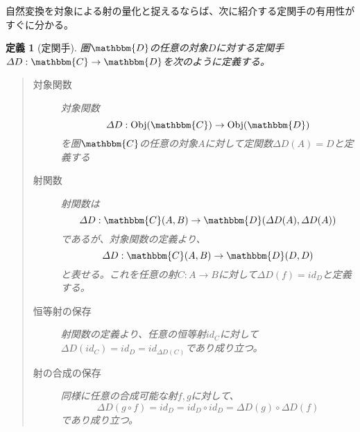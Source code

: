 \documentclass[uplatex,dvipdfmx]{jsarticle}
\newcommand{\cat}[1]{\mathbbm{#1}}
\newcommand{\arrow}{\rightarrow}
\newcommand{\functor}[3]{#1:\cat{#2}\arrow \cat{#3}}
\newcommand{\obj}[1]{\mathrm{Obj}(\cat{#1})}
\newcommand{\mor}[3]{#1:#2\arrow #3}
\newcommand{\arset}[3]{\cat{#1}(#2,#3)}
\newtheorem{define}{定義}[section]
\numberwithin{proof}{subsection}
\numberwithin{prop}{subsection}
\numberwithin{define}{subsection}
\begin{document}
  自然変換を対象による射の量化と捉えるならば、次に紹介する定関手の有用性がすぐに分かる。
  \begin{define}[定関手]
    圏$\cat{D}$の任意の対象$D$に対する定関手$\functor{\varDelta D}{C}{D}$を次のように定義する。
    \begin{quote}
			\begin{description}
				\item[対象関数] 対象関数\[\mor{\varDelta D}{\obj{C}}{\obj{D}}\]
				を圏$\cat{C}$の任意の対象$A$に対して定関数$\varDelta D(A)=D$と定義する 
				\item[射関数] 
        射関数は\[\mor{\varDelta D}{\arset{C}{A}{B}}{\arset{D}{\varDelta D(A)}{\varDelta D(A)}}\]であるが、対象関数の定義より、\[\mor{\varDelta D}{\arset{C}{A}{B}}{\arset{D}{D}{D}}\]と表せる。これを任意の射$\mor{C}{A}{B}$に対して$\varDelta D (f)=id_D$と定義する。
				\item[恒等射の保存] 射関数の定義より、任意の恒等射$id_C$に対して$\varDelta D (id_C)=id_D=id_{\varDelta D(C)}$であり成り立つ。
				\item[射の合成の保存] 同様に任意の合成可能な射$f,g$に対して、\[\varDelta D (g\circ f)=id_D=id_D\circ id_D=\varDelta D (g)\circ \varDelta D (f)\]であり成り立つ。
			\end{description}
		\end{quote}
    \begin{center}
    \end{center}
  \end{define}
\end{document}
